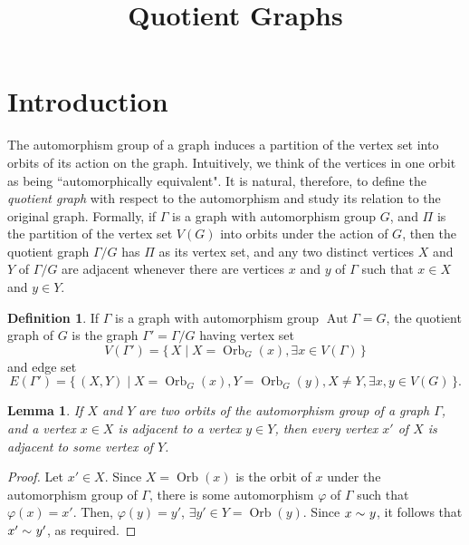\documentclass[12pt,a4paper]{amsart}
\title{Quotient Graphs}
\date{}
\newtheorem{Lemma}[Theorem]{Lemma}
\theoremstyle{remark}
\theoremstyle{definition}
\newtheorem{Definition}[Theorem]{Definition}
\newcommand{\adj}[1]{\sim_{\scriptscriptstyle #1}}
\DeclareMathOperator{\aut}{Aut}
\DeclareMathOperator{\orb}{Orb}
\begin{document}
\maketitle

\section{Introduction}
\label{sec:Intro}

The automorphism group of a graph induces a partition of the vertex set into orbits of its action on the graph. Intuitively, we think of the vertices in one orbit as being ``automorphically equivalent". It is natural, therefore, to define the \emph{quotient graph} with respect to the automorphism and study its relation to the original graph. Formally, if $\Gamma$ is a graph with automorphism group $G$, and $\mathcal \Pi$ is the partition of the vertex set $V(G)$ into orbits under the action of $G$, then the quotient graph $\Gamma/G$ has $\Pi$ as its vertex set, and any two distinct vertices $X$ and $Y$ of $\Gamma/G$ are adjacent whenever there are vertices $x$ and $y$ of $\Gamma$ such that $x \in X$ and $y \in Y$.

\begin{Definition}
If $\Gamma$ is a graph with automorphism group $\aut \Gamma = G$, the quotient graph of $G$ is the graph $\Gamma' = \Gamma/G$ having vertex set
\begin{equation*}
V(\Gamma') = \{\, X \mid X = \orb_G(x), \exists x \in V(\Gamma) \,\}
\end{equation*}
and edge set 
\begin{equation*}
E(\Gamma') = \{\, (X,Y) \mid X = \orb_G(x), Y = \orb_G(y), X \ne Y, \exists x, y \in V(G) \,\}.
\end{equation*}
\end{Definition}

\begin{Lemma}
\label{lem:xy=>x'y'}
If $X$ and $Y$ are two orbits of the automorphism group of a graph $\Gamma$, and a vertex $x \in X$ is adjacent to a vertex $y \in Y$, then every vertex $x'$ of $X$ is adjacent to some vertex of $Y$.
\end{Lemma}

\begin{proof}
Let $x' \in X$. Since $X = \orb(x)$ is the orbit of $x$ under the automorphism group of $\Gamma$, there is some automorphism $\varphi$ of $\Gamma$ such that $\varphi(x) = x'$. Then, $\varphi(y) = y'$, $\exists y' \in Y = \orb(y)$. Since $x \adj{} y$, it follows that $x' \adj{} y'$, as required.
\end{proof}
\end{document}
